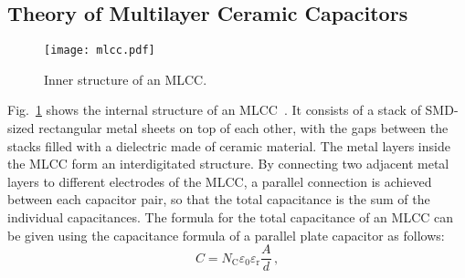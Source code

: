 \subsection{Theory of Multilayer Ceramic Capacitors}
\begin{figure}[ptb]
	\centering
	\texttt{[image: mlcc.pdf]}
	\caption{Inner structure of an MLCC.}
	\label{fig:mlcc}
\end{figure}
Fig.~\ref{fig:mlcc} shows the internal structure of an MLCC~\cite{5482787}. It consists of a stack of SMD-sized rectangular metal sheets on top of each other, with the gaps between the stacks filled with a dielectric made of ceramic material. The metal layers inside the MLCC form an interdigitated structure. By connecting two adjacent metal layers to different electrodes of the MLCC, a parallel connection is achieved between each capacitor pair, so that the total capacitance is the sum of the individual capacitances. The formula for the total capacitance of an MLCC can be given using the capacitance formula of a parallel plate capacitor as follows:
\begin{equation} \label{eqn:mlcc}
	C = N_{\mathrm{C}}\varepsilon_0\varepsilon_\mathrm{r}\frac{A}{d}\,,
\end{equation}
